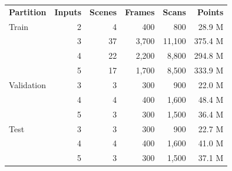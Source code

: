 \begin{frame}[t]{}
{\begin{minipage}[t]{8.00cm}
{        \begin{tabular}{l r r r r r}
          \rowcolor{MoverNavy}
          \color{white}\textbf{Partition} & \color{white}\textbf{Inputs} & \color{white}\textbf{Scenes} & \color{white}\textbf{Frames} & \color{white}\textbf{Scans} & \color{white}\textbf{Points} \\
          \rowcolor{MoverDatasetTrainFill}
          Train & 2 & 4 & 400 & 800 & 28.9 M \\
          \rowcolor{MoverDatasetTrainFill}
          & 3 & 37 & 3,700 & 11,100 & 375.4 M \\
          \rowcolor{MoverDatasetTrainFill}
          & 4 & 22 & 2,200 & 8,800 & 294.8 M \\
          \rowcolor{MoverDatasetTrainFill}
          & 5 & 17 & 1,700 & 8,500 & 333.9 M \\
          \rowcolor{MoverDatasetValidationFill}
          Validation & 3 & 3 & 300 & 900 & 22.0 M \\
          \rowcolor{MoverDatasetValidationFill}
          & 4 & 4 & 400 & 1,600 & 48.4 M \\
          \rowcolor{MoverDatasetValidationFill}
          & 5 & 3 & 300 & 1,500 & 36.4 M \\
          \rowcolor{MoverDatasetTestFill}
          Test & 3 & 3 & 300 & 900 & 22.7 M \\
          \rowcolor{MoverDatasetTestFill}
          & 4 & 4 & 400 & 1,600 & 41.0 M \\
          \rowcolor{MoverDatasetTestFill}
          & 5 & 3 & 300 & 1,500 & 37.1 M \\
        \end{tabular}\par
      }
    \end{minipage}
  }
\end{frame}
